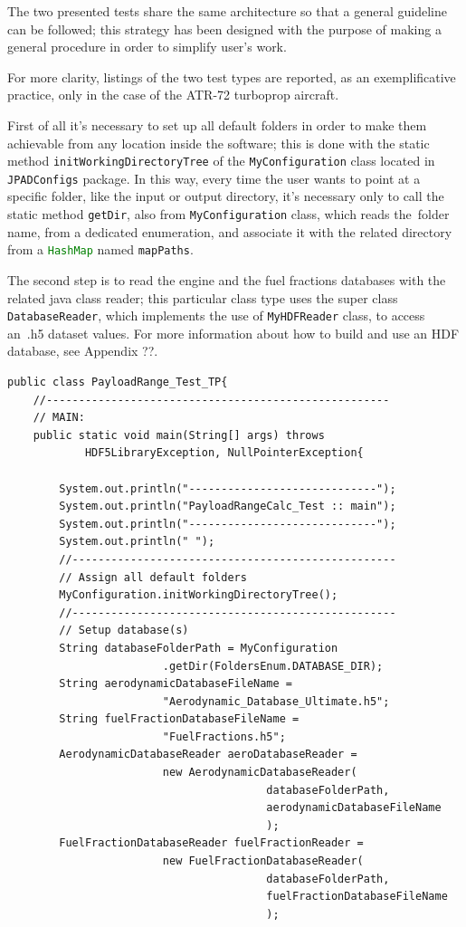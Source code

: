 \documentclass[a4paper,12pt,oneside]{book}
\begin{document}
\bigskip
The two presented tests share the same architecture so that a general guideline can be followed; this strategy has been designed with the purpose of making a general procedure in order to simplify user’s work.

For more clarity, listings of the two test types are reported, as an exemplificative practice, only in the case of the ATR-72 turboprop aircraft. 

\bigskip
First of all it’s necessary to set up all default folders in order to make them achievable from any location inside the software; this is done with the static method \lstinline[language=Java]!initWorkingDirectoryTree! of the \lstinline[language=Java]!MyConfiguration! class located in \lstinline[language=Java]!JPADConfigs! package. In this way, every time the user wants to point at a specific folder, like the input or output directory, it’s necessary only to call the static method \lstinline[language=Java]!getDir!, also from \lstinline[language=Java]!MyConfiguration!  class, which reads the~folder name, from a dedicated enumeration, and associate it with the related directory from a \lstinline[language=Java]!HashMap! named \lstinline[language=Java]!mapPaths!.

The second step is to read the engine and the fuel fractions databases with the related java class reader; this particular class type uses the super class \lstinline[language=Java]!DatabaseReader!, which implements the use of \lstinline[language=Java]!MyHDFReader! class, to access an~.h5 dataset values. For more information about how to build and use an HDF database, see Appendix ??.

\bigskip
\begin{lstlisting}[caption={Excerpt of the ATR-72 Payload-Range test - preliminary steps}, captionpos=b, tabsize=2]
public class PayloadRange_Test_TP{
	//-----------------------------------------------------
	// MAIN:
	public static void main(String[] args) throws
			HDF5LibraryException, NullPointerException{

		System.out.println("-----------------------------");
		System.out.println("PayloadRangeCalc_Test :: main");
		System.out.println("-----------------------------");
		System.out.println(" ");
		//--------------------------------------------------
		// Assign all default folders
		MyConfiguration.initWorkingDirectoryTree();
		//--------------------------------------------------
		// Setup database(s)	
		String databaseFolderPath = MyConfiguration
						.getDir(FoldersEnum.DATABASE_DIR);
		String aerodynamicDatabaseFileName = 
						"Aerodynamic_Database_Ultimate.h5";
		String fuelFractionDatabaseFileName = 
						"FuelFractions.h5";
		AerodynamicDatabaseReader aeroDatabaseReader = 
						new AerodynamicDatabaseReader(
										databaseFolderPath,
										aerodynamicDatabaseFileName
										);
		FuelFractionDatabaseReader fuelFractionReader =
						new FuelFractionDatabaseReader(
										databaseFolderPath,
										fuelFractionDatabaseFileName
										);
\end{lstlisting}
\end{document}
